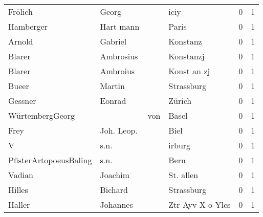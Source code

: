 \documentclass[10pt,a4paper,landscape]{article}
\begin{document}
\begin{longtable}{llllrr}
                  Frölich &                              Georg &             &                                        iciy &          0 &         1 \\
                Hamberger &                          Hart mann &             &                                       Paris &          0 &         1 \\
                   Arnold &                            Gabriel &             &                                    Konstanz &          0 &         1 \\
                   Blarer &                          Ambrosius &             &                                   Konstanzj &          0 &         1 \\
                   Blarer &                           Ambroius &             &                                 Konst an zj &          0 &         1 \\
                    Bueer &                             Martin &             &                                  Strassburg &          0 &         1 \\
                  Gessner &                             Eonrad &             &                                      Zürich &          0 &         1 \\
          WürtembergGeorg &                                    &         von &                                       Basel &          0 &         1 \\
                     Frey &                         Joh. Leop. &             &                                        Biel &          0 &         1 \\
                        V &                               s.n. &             &                                      irburg &          0 &         1 \\
   PfisterArtopoeusBaling &                               s.n. &             &                                        Bern &          0 &         1 \\
                   Vadian &                            Joachim &             &                                   St. allen &          0 &         1 \\
                   Hilles &                            Bichard &             &                                  Strassburg &          0 &         1 \\
                   Haller &                           Johannes &             &                            Ztr Ayv X o Ylcs &          0 &         1 \\

\end{longtable}
\end{document}
